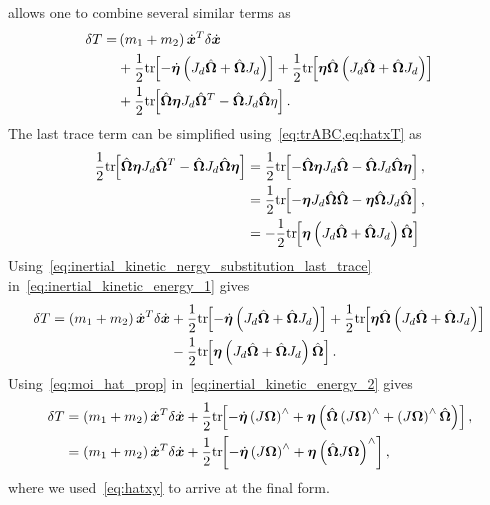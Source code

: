  allows one to combine several similar terms as
\begin{align}\label{eq:inertial_kinetic_energy_1}
    \delta T =&\left( m_1 + m_2 \right) \dot{\bm{x}}^T \delta \dot{\bm{x}} \nonumber\\
              &+ \frac{1}{2} \mathrm{tr}\negthickspace\left[ -\dot{\bm{\eta}} \left( J_d \hat{\bm{\Omega}} + \hat{\bm{\Omega}} J_d \right) \right] + \frac{1}{2} \mathrm{tr}\negthickspace\left[ \bm{\eta} \hat{\bm{\Omega}} \left( J_d \hat{\bm{\Omega}} + \hat{\bm{\Omega}} J_d \right) \right] \nonumber \\
              &+ \frac{1}{2} \mathrm{tr}\negthickspace\left[  \hat{\bm{\Omega}} \bm{\eta} J_d \hat{\bm{\Omega}}^T - \hat{\bm{\Omega}} J_d \hat{\bm{\Omega}} \eta \right].
\end{align}
The last trace term can be simplified using~\cref{eq:trABC,eq:hatxT} as
\begin{align}\label{eq:inertial_kinetic_nergy_substitution_last_trace}
    \frac{1}{2} \mathrm{tr}\negthickspace\left[  \hat{\bm{\Omega}} \bm{\eta} J_d \hat{\bm{\Omega}}^T - \hat{\bm{\Omega}} J_d \hat{\bm{\Omega}} \bm{\eta} \right] &= \frac{1}{2} \mathrm{tr}\negthickspace\left[  - \hat{\bm{\Omega}} \bm{\eta} J_d \hat{\bm{\Omega}} - \hat{\bm{\Omega}} J_d \hat{\bm{\Omega}} \bm{\eta} \right],\nonumber \\
                                                                                                      &= \frac{1}{2} \mathrm{tr}\negthickspace\left[  - \bm{\eta} J_d \hat{\bm{\Omega}} \hat{\bm{\Omega}} - \bm{\eta} \hat{\bm{\Omega}} J_d \hat{\bm{\Omega}}  \right], \nonumber\\
                                                                                                      &= -\frac{1}{2} \mathrm{tr}\negthickspace\left[ \bm{\eta} \left( J_d \hat{\bm{\Omega}} + \hat{\bm{\Omega}} J_d  \right)\hat{\bm{\Omega}} \right]
\end{align}
Using~\cref{eq:inertial_kinetic_nergy_substitution_last_trace} in~\cref{eq:inertial_kinetic_energy_1} gives
\begin{align}\label{eq:inertial_kinetic_energy_2}
    \delta T =\left( m_1 + m_2 \right) \dot{\bm{x}}^T \delta \dot{\bm{x}} &+ \frac{1}{2} \mathrm{tr}\negthickspace\left[ -\dot{\bm{\eta}} \left( J_d \hat{\bm{\Omega}} + \hat{\bm{\Omega}} J_d \right) \right] + \frac{1}{2} \mathrm{tr}\negthickspace\left[ \bm{\eta} \hat{\bm{\Omega}} \left( J_d \hat{\bm{\Omega}} + \hat{\bm{\Omega}} J_d \right) \right] \nonumber \\
              &- \frac{1}{2} \mathrm{tr}\negthickspace\left[  \bm{\eta} \left( J_d \hat{\bm{\Omega}} + \hat{\bm{\Omega}} J_d  \right)\hat{\bm{\Omega}} \right].
\end{align}
Using~\cref{eq:moi_hat_prop} in~\cref{eq:inertial_kinetic_energy_2} gives
\begin{align}\label{eq:kinetic_energy_variation_final}
    \delta T &= \left( m_1 + m_2 \right) \dot{\bm{x}}^T \delta \dot{\bm{x}} + \frac{1}{2} \mathrm{tr}\negthickspace\left[ -\dot{\bm{\eta}} \left( J\bm{\Omega} \right)^\wedge + \bm{\eta} \left(  \hat{\bm{\Omega}} \left( J\bm{\Omega} \right)^\wedge + \left( J \bm{\Omega} \right)^\wedge \hat{\bm{\Omega}} \right)  \right] , \nonumber\\
             &=  \left( m_1 + m_2 \right) \dot{\bm{x}}^T \delta \dot{\bm{x}} + \frac{1}{2} \mathrm{tr}\negthickspace\left[  - \dot{\bm{\eta}} \left( J \bm{\Omega} \right)^\wedge + \bm{\eta} \left( \hat{\bm{\Omega}} J \bm{\Omega} \right)^\wedge \right] , 
\end{align}
where we used~\cref{eq:hatxy} to arrive at the final form.


